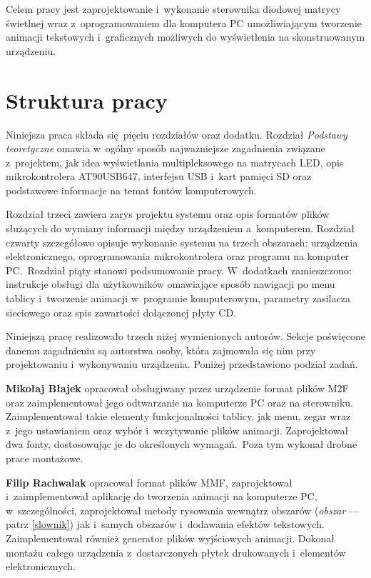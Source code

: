 Celem pracy jest zaprojektowanie i~wykonanie sterownika diodowej matrycy świetlnej wraz z~oprogramowaniem dla komputera PC umożliwiającym tworzenie animacji tekstowych i~graficznych możliwych do wyświetlenia na skonstruowanym urządzeniu.

\section{Struktura pracy}

Niniejsza praca składa się pięciu rozdziałów oraz dodatku. Rozdział \textit{Podstawy teoretyczne} omawia w~ogólny sposób najważniejsze zagadnienia związane z~projektem, jak idea wyświetlania multipleksowego na matrycach LED, opis mikrokontrolera AT90USB647, interfejsu USB i~kart pamięci SD oraz podstawowe informacje na temat fontów komputerowych.

Rozdział trzeci zawiera zarys projektu systemu oraz opis formatów plików służących do wymiany informacji między urządzeniem a~komputerem. Rozdział czwarty szczegółowo opisuje wykonanie systemu na trzech obszarach: urządzenia elektronicznego, oprogramowania mikrokontrolera oraz programu na komputer PC.~Rozdział piąty stanowi podsumowanie pracy.  W~dodatkach zamieszczono: instrukcje obsługi dla użytkowników omawiające sposób nawigacji po menu tablicy i~tworzenie animacji w~programie komputerowym, parametry zasilacza sieciowego oraz spis zawartości dołączonej płyty CD.

Niniejszą pracę realizowało trzech niżej wymienionych autorów. Sekcje poświęcone danemu zagadnieniu są autorstwa osoby, która zajmowała się nim przy projektowaniu i~wykonywaniu urządzenia. Poniżej przedstawiono podział zadań.

\textbf{Mikołaj Błajek} opracował obsługiwany przez urządzenie format plików M2F oraz zaimplementował jego odtwarzanie na komputerze PC oraz na sterowniku. Zaimplementował takie elementy funkcjonalności tablicy, jak menu, zegar wraz z~jego ustawianiem oraz wybór i~wczytywanie plików animacji. Zaprojektował dwa fonty, dostosowując je do określonych wymagań.~Poza tym wykonał drobne prace montażowe.

\textbf{Filip Rachwalak} opracował format plików MMF, zaprojektował i~zaimplementował aplikację do tworzenia animacji na komputerze PC, w~szczególności, zaprojektował metody rysowania wewnątrz obszarów (\textit{obszar} --- patrz \ref{slownik}) jak i~samych obszarów i~dodawania efektów tekstowych. Zaimplementował również generator plików wyjściowych animacji. Dokonał montażu całego urządzenia z~dostarczonych płytek drukowanych i~elementów elektronicznych.

